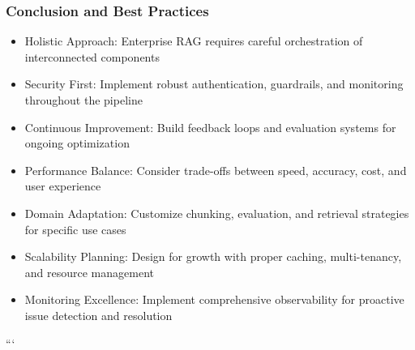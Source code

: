 \begin{frame}[fragile]\frametitle{Conclusion and Best Practices}
      \begin{itemize}
        \item Holistic Approach: Enterprise RAG requires careful orchestration of interconnected components
        \item Security First: Implement robust authentication, guardrails, and monitoring throughout the pipeline
        \item Continuous Improvement: Build feedback loops and evaluation systems for ongoing optimization
        \item Performance Balance: Consider trade-offs between speed, accuracy, cost, and user experience
        \item Domain Adaptation: Customize chunking, evaluation, and retrieval strategies for specific use cases
        \item Scalability Planning: Design for growth with proper caching, multi-tenancy, and resource management
        \item Monitoring Excellence: Implement comprehensive observability for proactive issue detection and resolution
      \end{itemize}
\end{frame}
```